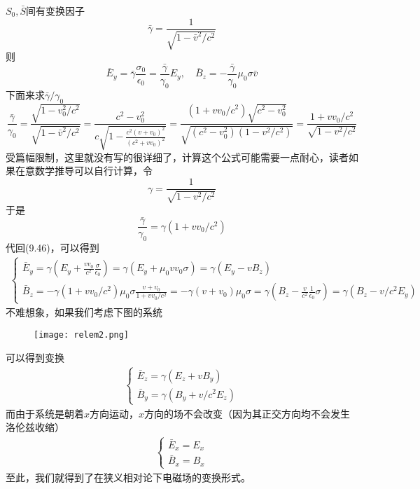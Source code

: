 \documentclass[14pt,oneside]{book}
\begin{document}
\begin{large}
\begin{equation}
\end{equation}
$S_0,\bar S$间有变换因子
\begin{equation}
  \bar \gamma=\frac{1}{\sqrt{1-\bar v^2/c^2}}
\end{equation}
则
\begin{equation}
  \bar E_y=\bar \gamma\frac{\sigma_0}{\epsilon_0}=\frac{\bar \gamma}{\gamma_0}E_y,\quad\bar B_z=-\frac{\bar \gamma}{\gamma_0}\mu_0\sigma\bar v
\end{equation}
下面来求$\bar \gamma/\gamma_0$
\begin{equation}
  \frac{\bar \gamma}{\gamma_0}=\frac{\sqrt{1-v_0^2/c^2}}{\sqrt{1-\bar v^2/c^2}}=\frac{c^2-v_0^2}{c\sqrt{1-\frac{c^2(v+v_0)^2}{(c^2+vv_0)^2}}}=\frac{(1+vv_0/c^2)\sqrt{c^2-v_0^2}}{\sqrt{(c^2-v_0^2)(1-v^2/c^2)}}=\frac{1+vv_0/c^2}{\sqrt{1-v^2/c^2}}
\end{equation}
受篇幅限制，这里就没有写的很详细了，计算这个公式可能需要一点耐心，读者如果在意数学推导可以自行计算，令
\begin{equation}
  \gamma=\frac{1	}{\sqrt{1-v^2/c^2}}
\end{equation}
于是
\begin{equation}
  \frac{\bar \gamma}{\gamma_0}=\gamma(1+vv_0/c^2)
\end{equation}
代回(9.46)，可以得到
\begin{align}
\begin{cases}
		    \bar E_y=\gamma (E_y+\frac{vv_0}{c^2}\frac{\sigma}{\epsilon_0})=\gamma(E_y+\mu_0vv_0\sigma)=\gamma(E_y-vB_z)	\\
		    \bar B_z=-\gamma(1+vv_0/c^2)\mu_0\sigma\frac{v+v_0}{1+vv_0/c^2}=-\gamma(v+v_0)\mu_0\sigma=\gamma(B_z-\frac{v}{c^2}\frac{1}{\epsilon_0}\sigma)=\gamma(B_z-v/c^2E_y)
\end{cases}
\end{align}
不难想象，如果我们考虑下图的系统
\begin{figure}[H]
\centering
  \texttt{[image: relem2.png]}
\end{figure}
可以得到变换
\begin{align}
\begin{cases}
		    \bar E_z=\gamma(E_z+vB_y)	\\
		    \bar B_y=\gamma(B_y+v/c^2E_z)
\end{cases}
\end{align}
而由于系统是朝着$x$方向运动，$x$方向的场不会改变（因为其正交方向均不会发生洛伦兹收缩）
\begin{align}
	  \begin{cases}
	  \bar E_x =E_x\\
	  \bar B_x = B_x	
	  \end{cases}	
\end{align}
至此，我们就得到了在狭义相对论下电磁场的变换形式。

\end{large}
\end{document}

